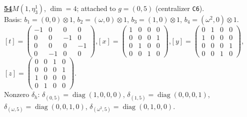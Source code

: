 \begin{samepage}\noindent\textbf{\underline{54}}\quad $M(1,\eta^{1}_{3})$, $\dim=4$; attached to $g=(0,5)$ (centralizer \texttt{C6}).\\
Basis: $b_{1}=(0,0)\otimes 1$, $b_{2}=(\omega,0)\otimes 1$, $b_{3}=(1,0)\otimes 1$, $b_{4}=(\omega^2,0)\otimes 1$.\\
$[t]=\left(\begin{smallmatrix} -1 & 0 & 0 & 0 \\ 0 & 0 & -1 & 0 \\ 0 & 0 & 0 & -1 \\ 0 & -1 & 0 & 0 \end{smallmatrix}\right)$,\quad $[x]=\left(\begin{smallmatrix} 1 & 0 & 0 & 0 \\ 0 & 0 & 0 & 1 \\ 0 & 1 & 0 & 0 \\ 0 & 0 & 1 & 0 \end{smallmatrix}\right)$,\quad $[y]=\left(\begin{smallmatrix} 0 & 1 & 0 & 0 \\ 1 & 0 & 0 & 0 \\ 0 & 0 & 0 & 1 \\ 0 & 0 & 1 & 0 \end{smallmatrix}\right)$,\quad $[z]=\left(\begin{smallmatrix} 0 & 0 & 1 & 0 \\ 0 & 0 & 0 & 1 \\ 1 & 0 & 0 & 0 \\ 0 & 1 & 0 & 0 \end{smallmatrix}\right)$.\\
Nonzero $\delta_h$: $\delta_{(0,5)}=\operatorname{diag}(1,0,0,0)$, $\delta_{(1,5)}=\operatorname{diag}(0,0,0,1)$, $\delta_{(\omega,5)}=\operatorname{diag}(0,0,1,0)$, $\delta_{(\omega^2,5)}=\operatorname{diag}(0,1,0,0)$.\end{samepage}
\medskip

